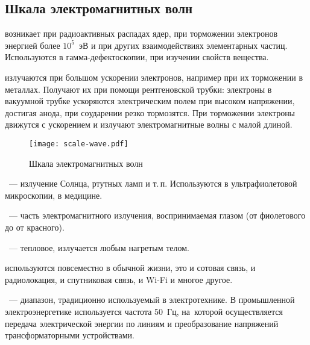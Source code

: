 \subsection{Шкала электромагнитных волн}


 возникает при радиоактивных распадах ядер, при торможении электронов энергией более $10^5$~эВ и при других взаимодействиях элементарных частиц. Используются в гамма-дефектоскопии, при изучении свойств вещества.

 излучаются при большом ускорении электронов, например при их торможении в металлах. Получают их при помощи рентгеновской трубки: электроны в вакуумной трубке ускоряются электрическим полем при высоком напряжении, достигая анода, при со­ударении резко тормозятся. При торможении электроны движут­ся с ускорением и излучают электромагнитные волны с малой длиной. 

\begin{figure}[!h]
\centering
\texttt{[image: scale-wave.pdf]}
\caption{Шкала электромагнитных волн}
\end{figure}
~--- излучение Солнца, ртутных ламп и т.\,п. Используются в ультрафиолетовой микроскопии, в медицине.

~--- часть электромагнитного излучения, воспринимаемая глазом (от фиолетового до от красного).

~--- тепловое, излучается любым нагретым телом.

 используются повсеместно в обычной жизни, это и сотовая связь, и радиолокация, и спутниковая связь, и Wi-Fi и многое другое.

~--- диапазон, традиционно используемый в электротехнике. В промышленной электроэнергетике используется частота 50~Гц, на~которой осуществляется передача электрической энергии по линиям и преобразование напряжений трансформаторными устройствами.
